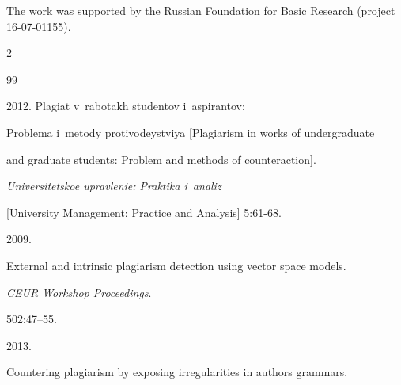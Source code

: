 \Ack

\noindent

The work was supported by the Russian Foundation for Basic Research (project 16-07-01155).










  \begin{multicols}{2}



\renewcommand{\bibname}{\protect\rmfamily References}




{\small\frenchspacing

 {%


 \begin{thebibliography}{99}





2012. Plagiat v~rabotakh studentov i~aspirantov: 

Problema i~metody protivodeystviya [Plagiarism in works of undergraduate 

and graduate students: Problem and methods of counteraction]. 

\textit{Universitetskoe upravlenie: Praktika i~analiz} 

[University Management: Practice and Analysis] 5:61-68.




 2009. 

External and intrinsic plagiarism detection using vector space models. 

\textit{CEUR Workshop Proceedings}.

 502:47--55.




 2013. 

Countering pla\-gi\-arism by exposing irregularities in authors grammars. 


\end{thebibliography}}}
\end{multicols}
